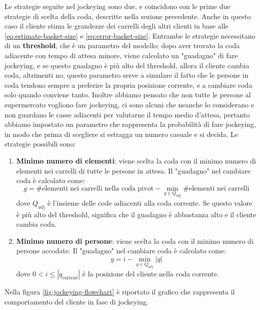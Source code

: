 Le strategie seguite nel jockeying sono due, e coincidono con le prime due strategie di scelta della coda, descritte nella sezione precedente. Anche in questo caso il cliente stima le grandezze dei carrelli degli altri clienti in base alle \ref{eq:estimate-basket-size} e \ref{eq:error-basket-size}.
Entrambe le strategie necessitano di un \textbf{threshold}, che è un parametro del modello; dopo aver trovato la coda adiacente con tempo di attesa minore, viene calcolato un "guadagno" di fare jockeying, e se questo guadagno è più alto del threshold, allora il cliente cambia coda, altrimenti no; questo parametro serve a simulare il fatto che le persone in coda tendono sempre a preferire la propria posizione corrente, e a cambiare coda solo quando conviene tanto. 
Inoltre abbiamo pensato che non tutte le persone al supermercato vogliono fare jockeying, ci sono alcuni che neanche lo considerano e non guardano le casse adiacenti per valutarne il tempo medio d'attesa, pertanto abbiamo impostato un parametro che rappresenta la probabilità di fare jockeying, in modo che prima di scegliere si estragga un numero casuale e si decida. Le strategie possibili sono:

\begin{enumerate}
\item \textbf{Minimo numero di elementi}: viene scelta la coda con il minimo numero di elementi nei carrelli di tutte le persone in attesa. Il "guadagno" nel cambiare coda è calcolato come:
\begin{equation}
	g = \# \text{elementi nei carrelli nella coda pivot} - \min\limits_{q \in Q_{\text{adj}}} \# \text{elementi nei carrelli}
\end{equation}
dove $Q_{\text{adj}}$ è l'insieme delle code adiacenti alla coda corrente. Se questo valore è più alto del threshold, significa che il guadagno è abbastanza alto e il cliente cambia coda.
\item \textbf{Minimo numero di persone}: viene scelta la coda con il minimo numero di persone accodate. Il "guadagno" nel cambiare coda è calcolato come:
\begin{equation}
	g = i - \min\limits_{q \in Q_{\text{adj}}} |q|
\end{equation}
dove $0 < i \le |q_{\text{current}}|$ è la posizione del cliente nella coda corrente.
\end{enumerate}

Nella figura \ref{fig:jockeying-flowchart} è riportato il grafico che rappresenta il comportamento del cliente in fase di jockeying.

